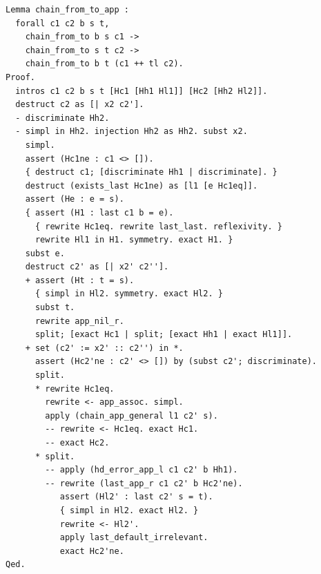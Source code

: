 \begin{latin}
\begin{verbatim}
Lemma chain_from_to_app :
  forall c1 c2 b s t,
    chain_from_to b s c1 ->
    chain_from_to s t c2 ->
    chain_from_to b t (c1 ++ tl c2).
Proof.
  intros c1 c2 b s t [Hc1 [Hh1 Hl1]] [Hc2 [Hh2 Hl2]].
  destruct c2 as [| x2 c2'].
  - discriminate Hh2.
  - simpl in Hh2. injection Hh2 as Hh2. subst x2.
    simpl.
    assert (Hc1ne : c1 <> []).
    { destruct c1; [discriminate Hh1 | discriminate]. }
    destruct (exists_last Hc1ne) as [l1 [e Hc1eq]].
    assert (He : e = s).
    { assert (H1 : last c1 b = e).
      { rewrite Hc1eq. rewrite last_last. reflexivity. }
      rewrite Hl1 in H1. symmetry. exact H1. }
    subst e.
    destruct c2' as [| x2' c2''].
    + assert (Ht : t = s).
      { simpl in Hl2. symmetry. exact Hl2. }
      subst t.
      rewrite app_nil_r.
      split; [exact Hc1 | split; [exact Hh1 | exact Hl1]].
    + set (c2' := x2' :: c2'') in *.
      assert (Hc2'ne : c2' <> []) by (subst c2'; discriminate).
      split.
      * rewrite Hc1eq.
        rewrite <- app_assoc. simpl.
        apply (chain_app_general l1 c2' s).
        -- rewrite <- Hc1eq. exact Hc1.
        -- exact Hc2.
      * split.
        -- apply (hd_error_app_l c1 c2' b Hh1).
        -- rewrite (last_app_r c1 c2' b Hc2'ne).
           assert (Hl2' : last c2' s = t).
           { simpl in Hl2. exact Hl2. }
           rewrite <- Hl2'.
           apply last_default_irrelevant.
           exact Hc2'ne.
Qed.


\end{verbatim}
\end{latin}
